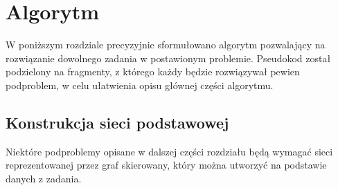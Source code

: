 \documentclass[12pt,a4paper]{article}
\theoremstyle{definition}
\begin{document}
\section{Algorytm}
\label{sec:algorithm}
W poniższym rozdziale precyzyjnie sformułowano algorytm pozwalający na rozwiązanie dowolnego zadania w postawionym problemie. Pseudokod został podzielony na fragmenty, z którego każdy będzie rozwiązywał pewien podproblem, w celu ułatwienia opisu głównej części algorytmu.

\subsection{Konstrukcja sieci podstawowej}
Niektóre podproblemy opisane w dalszej części rozdziału będą wymagać sieci reprezentowanej przez graf skierowany, który można utworzyć na podstawie danych z zadania.
\end{document}
